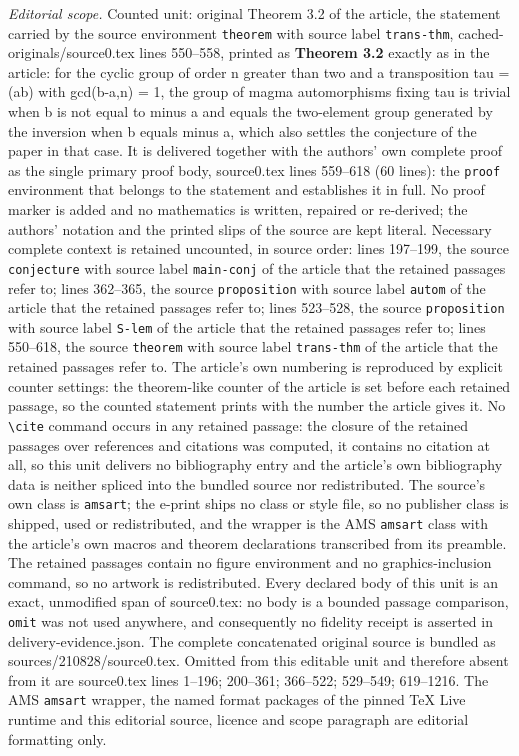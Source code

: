 \documentclass[10pt,a4paper]{amsart}
\numberwithin{equation}{section}
\theoremstyle{definition}
\begin{document}
\noindent\textit{Editorial scope.} Counted unit: original Theorem 3.2 of the article, the statement carried by the source environment \texttt{theorem} with source label \texttt{trans-thm}, cached-originals/source0.tex lines 550--558, printed as \textbf{Theorem 3.2} exactly as in the article: for the cyclic group of order n greater than two and a transposition tau = (ab) with gcd(b-a,n) = 1, the group of magma automorphisms fixing tau is trivial when b is not equal to minus a and equals the two-element group generated by the inversion when b equals minus a, which also settles the conjecture of the paper in that case. It is delivered together with the authors' own complete proof as the single primary proof body, source0.tex lines 559--618 (60 lines): the \texttt{proof} environment that belongs to the statement and establishes it in full. No proof marker is added and no mathematics is written, repaired or re-derived; the authors' notation and the printed slips of the source are kept literal. Necessary complete context is retained uncounted, in source order: lines 197--199, the source \texttt{conjecture} with source label \texttt{main-conj} of the article that the retained passages refer to; lines 362--365, the source \texttt{proposition} with source label \texttt{autom} of the article that the retained passages refer to; lines 523--528, the source \texttt{proposition} with source label \texttt{S-lem} of the article that the retained passages refer to; lines 550--618, the source \texttt{theorem} with source label \texttt{trans-thm} of the article that the retained passages refer to. The article's own numbering is reproduced by explicit counter settings: the theorem-like counter of the article is set before each retained passage, so the counted statement prints with the number the article gives it. No \texttt{\textbackslash cite} command occurs in any retained passage: the closure of the retained passages over references and citations was computed, it contains no citation at all, so this unit delivers no bibliography entry and the article's own bibliography data is neither spliced into the bundled source nor redistributed. The source's own class is \texttt{amsart}; the e-print ships no class or style file, so no publisher class is shipped, used or redistributed, and the wrapper is the AMS \texttt{amsart} class with the article's own macros and theorem declarations transcribed from its preamble. The retained passages contain no figure environment and no graphics-inclusion command, so no artwork is redistributed. Every declared body of this unit is an exact, unmodified span of source0.tex: no body is a bounded passage comparison, \texttt{omit} was not used anywhere, and consequently no fidelity receipt is asserted in delivery-evidence.json. The complete concatenated original source is bundled as sources/210828/source0.tex. Omitted from this editable unit and therefore absent from it are source0.tex lines 1--196; 200--361; 366--522; 529--549; 619--1216. The AMS \texttt{amsart} wrapper, the named format packages of the pinned TeX Live runtime and this editorial source, licence and scope paragraph are editorial formatting only.\par\smallskip
\end{document}
